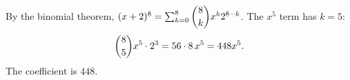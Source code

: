 By the binomial theorem, $(x+2)^8=\sum_{k=0}^{8}\dbinom8k x^k2^{8-k}$. The $x^5$ term has $k=5$:
\[
\dbinom85x^5\cdot2^3=56\cdot8\,x^5=448x^5 .
\]
The coefficient is $\boxed{448}$.
